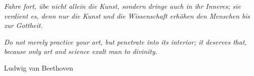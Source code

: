 \documentclass[11pt, a4paper, doubleside]{Thesis}
\title{\ttitle} %
\begin{document}
\frontmatter %


\fancyhead{} %
\rhead{\thepage} %
\lhead{} %

\pagestyle{fancy} %

\newcommand{\HRule}{\rule{\linewidth}{0.5mm}} %

\hypersetup{pdfsubject=\subjectname}
\hypersetup{pdfauthor=\authornames}
\hypersetup{pdfkeywords=\keywordnames}

\begin{titlepage}
\maketitle
\end{titlepage}
\clearpage


\pagestyle{empty} %

\null\vfill %
\begin{flushright}
\textit{Fahre fort, übe nicht allein die Kunst, sondern dringe auch in ihr Inneres; sie verdient es, denn nur die Kunst und die Wissenschaft erhöhen den Menschen bis zur Gottheit.
}
\end{flushright}
\begin{flushright}
\textit{Do not merely practice your art, but penetrate into its interior; it deserves that, because only art and science exalt man to divinity.
}
\end{flushright}


\begin{flushright}
Ludwig van Beethoven
\end{flushright}
\end{document}
